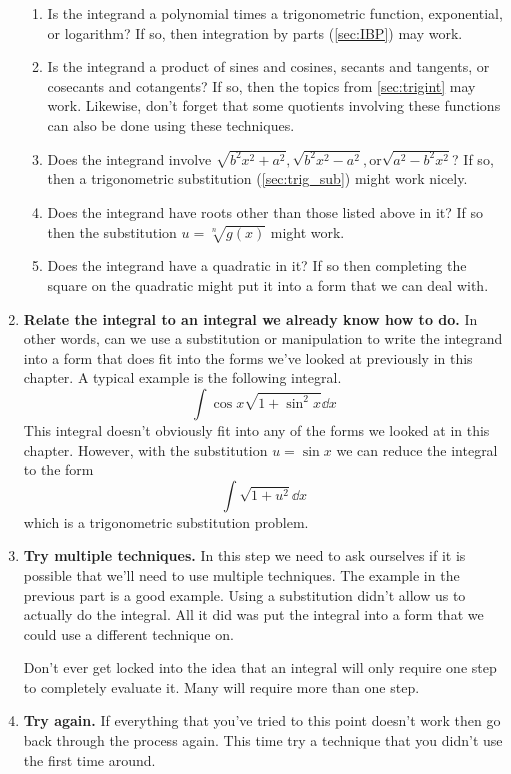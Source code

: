 \begin{enumerate}
\begin{enumerate}
\item Is the integrand a polynomial times a trigonometric function, exponential, or logarithm? If so, then integration by parts (\autoref{sec:IBP}) may work.

\item Is the integrand a product of sines and cosines, secants and tangents, or cosecants and cotangents? If so, then the topics from \autoref{sec:trigint} may work. Likewise, don't forget that some quotients involving these functions can also be done using these techniques.

\item Does the integrand involve $\sqrt {b^2x^2 + a^2}, \sqrt {b^2x^2 - a^2}, \text{or} \sqrt { a^2-b^2x^2}$? If so, then a trigonometric substitution (\autoref{sec:trig_sub}) might work nicely.

\item Does the integrand have roots other than those listed above in it? If so then the substitution $u=\sqrt[n]{g(x)}$ might work.

\item Does the integrand have a quadratic in it? If so then completing the square on the quadratic might put it into a form that we can deal with. 
\end{enumerate}

\item \textbf{Relate the integral to an integral we already know how to do.} In other words, can we use a substitution or manipulation to write the integrand into a  form that does fit into the forms we've looked at previously in this chapter. A typical example is the following integral.
\[\int \cos x\sqrt{1 + \sin^2 x}\dd x\]
This integral doesn't obviously fit into any of the forms we looked at in this chapter. However, with the substitution $u = \sin x$ we can reduce the integral to the form
\[\int \sqrt{1+u^2}\dd x\]
which is a trigonometric substitution problem.

\item \textbf{Try multiple techniques.} In this step we need to ask ourselves if it is possible that we'll need to use multiple techniques. The example in the previous part is a good example. Using a substitution didn't allow us to actually do the integral. All it did was put the integral into a form that we could use a different technique on.

Don't ever get locked into the idea that an integral will only require one step to completely evaluate it. Many will require more than one step.

\item \textbf{Try again.} If everything that you've tried to this point doesn't work then go back through the process again. This time try a technique that you didn't use the first time around.
\end{enumerate}

